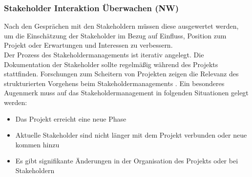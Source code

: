 \documentclass[ThesisDJ.tex]{subfiles}
\begin{document}
\subsubsection{Stakeholder Interaktion Überwachen (NW)}
Nach den Gesprächen mit den Stakeholdern müssen diese ausgewertet werden, um die Einschätzung der Stakeholder im Bezug auf Einfluss,
Position zum Projekt oder Erwartungen und Interessen zu verbessern.\\
Der Prozess des Stakeholdermanagements ist iterativ angelegt. Die Dokumentation der Stakeholder sollte regelmäßig während
des Projekts stattfinden. Forschungen zum Scheitern von Projekten zeigen die Relevanz des strukturierten Vorgehens 
beim Stakeholdermanagements \cite[S.~488]{project_management_institute_guide_2017}.
Ein besonderes Augenmerk muss auf das Stakeholdermanagement in folgenden Situationen gelegt werden:

\begin{itemize}
	\item Das Projekt erreicht eine neue Phase
	\item Aktuelle Stakeholder sind nicht länger mit dem Projekt verbunden oder neue kommen hinzu
	\item Es gibt signifikante Änderungen in der Organisation des Projekts oder bei Stakeholdern
\end{itemize}
	
\end{document}
